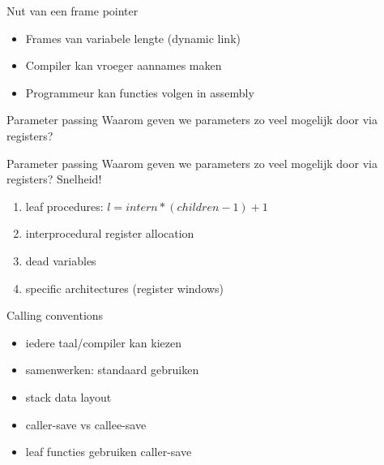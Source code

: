 \documentclass{beamer}
\begin{document}


\begin{frame}{Nut van een frame pointer}
	\begin{itemize}
	    \item Frames van variabele lengte (dynamic link)
	    \item Compiler kan vroeger aannames maken
	    \item Programmeur kan functies volgen in assembly
	\end{itemize}
\end{frame}

\begin{frame}{Parameter passing}
Waarom geven we parameters zo veel mogelijk door via registers?
\end{frame}

\begin{frame}{Parameter passing}
	Waarom geven we parameters zo veel mogelijk door via registers?
	Snelheid!
    \begin{enumerate}
        \item leaf procedures: $l = intern * (children-1) + 1$
        \item interprocedural register allocation
        \item dead variables
        \item specific architectures (register windows)
    \end{enumerate}
\end{frame}

\begin{frame}{Calling conventions}
	\begin{itemize}
	    \item iedere taal/compiler kan kiezen
	    \item samenwerken: standaard gebruiken
	    \item stack data layout
	    \item caller-save vs callee-save
	    \item leaf functies gebruiken caller-save
	\end{itemize}
\end{frame}
\end{document}
